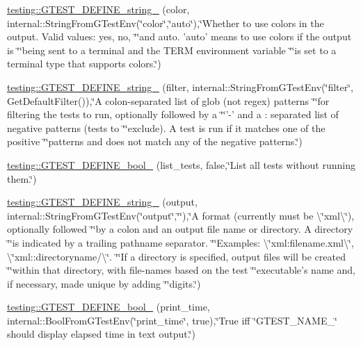\begin{DoxyCompactItemize}
\item 
\hyperlink{namespacetesting_a00b4a4eabdef5927208aeabd81220069}{testing\-::\-G\-T\-E\-S\-T\-\_\-\-D\-E\-F\-I\-N\-E\-\_\-string\-\_\-} (color, internal\-::\-String\-From\-G\-Test\-Env(\char`\"{}color\char`\"{},\char`\"{}auto\char`\"{}),\char`\"{}Whether to use colors in the output.  Valid values\-: yes, no, \char`\"{}\char`\"{}and auto.  'auto' means to use colors if the output is \char`\"{}\char`\"{}being sent to a terminal and the T\-E\-R\-M environment variable \char`\"{}\char`\"{}is set to a terminal type that supports colors.\char`\"{})
\item 
\hyperlink{namespacetesting_aa7039e72c7b7041f11d2619c93a934d6}{testing\-::\-G\-T\-E\-S\-T\-\_\-\-D\-E\-F\-I\-N\-E\-\_\-string\-\_\-} (filter, internal\-::\-String\-From\-G\-Test\-Env(\char`\"{}filter\char`\"{}, Get\-Default\-Filter()),\char`\"{}A colon-\/separated list of glob (not regex) patterns \char`\"{}\char`\"{}for filtering the tests to run, optionally followed by a \char`\"{}\char`\"{}'-\/' and a \-: separated list of negative patterns (tests to \char`\"{}\char`\"{}exclude).  A test is run if it matches one of the positive \char`\"{}\char`\"{}patterns and does not match any of the negative patterns.\char`\"{})
\item 
\hyperlink{namespacetesting_a9ef54a5b29ac4b2a1e086e77224a0b19}{testing\-::\-G\-T\-E\-S\-T\-\_\-\-D\-E\-F\-I\-N\-E\-\_\-bool\-\_\-} (list\-\_\-tests, false,\char`\"{}List all tests without running them.\char`\"{})
\item 
\hyperlink{namespacetesting_a9f8de43b364103bafa1e8ca4bebe9d58}{testing\-::\-G\-T\-E\-S\-T\-\_\-\-D\-E\-F\-I\-N\-E\-\_\-string\-\_\-} (output, internal\-::\-String\-From\-G\-Test\-Env(\char`\"{}output\char`\"{},\char`\"{}\char`\"{}),\char`\"{}A format (currently must be \textbackslash{}\char`\"{}xml\textbackslash{}\char`\"{}), optionally followed \char`\"{}\char`\"{}by a colon and an output file name or directory. A directory \char`\"{}\char`\"{}is indicated by a trailing pathname separator. \char`\"{}\char`\"{}Examples\-: \textbackslash{}\char`\"{}xml\-:filename.\-xml\textbackslash{}\char`\"{}, \textbackslash{}\char`\"{}xml\-::directoryname/\textbackslash{}\char`\"{}. \char`\"{}\char`\"{}If a directory is specified, output files will be created \char`\"{}\char`\"{}within that directory, with file-\/names based on the test \char`\"{}\char`\"{}executable's name and, if necessary, made unique by adding \char`\"{}\char`\"{}digits.\char`\"{})
\item 
\hyperlink{namespacetesting_a51fb68302e8e3fce5bd61340843a6e6a}{testing\-::\-G\-T\-E\-S\-T\-\_\-\-D\-E\-F\-I\-N\-E\-\_\-bool\-\_\-} (print\-\_\-time, internal\-::\-Bool\-From\-G\-Test\-Env(\char`\"{}print\-\_\-time\char`\"{}, true),\char`\"{}True iff \char`\"{}G\-T\-E\-S\-T\-\_\-\-N\-A\-M\-E\-\_\-\char`\"{} should display elapsed time in text output.\char`\"{})

\end{DoxyCompactItemize}

